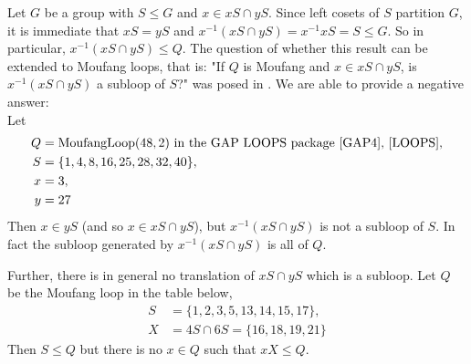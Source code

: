 \documentclass[12pt]{report}
\theoremstyle{definition}
\begin{document}
Let $G$ be a group with $S\leq G$ and $x\in xS\cap yS$. Since left cosets of $S$ partition $G$,
  it is immediate that $xS = yS$ and $x^{-1}(xS\cap yS) = x^{-1}xS = S\leq G$. So in particular,
  $x^{-1}(xS \cap yS) \leq Q$. The question of whether this result can be extended to Moufang
  loops, that is: "If $Q$ is Moufang and $x\in xS\cap yS$, is $x^{-1}(xS\cap yS)$ a subloop of
  $S$?" was posed in \cite{incidence}. We are able to provide a negative answer:\\ 
Let 
  \begin{align*}
    Q &= \text{MoufangLoop}(48, 2)\text{ in the GAP LOOPS package \cite{GAP4}, \cite{LOOPS},}\\
    S &= \{1,4,8,16,25,28,32,40\},\\
    x &= 3,\\
    y &= 27
  \end{align*}
Then $x\in yS$ (and so $x\in xS\cap yS$), but $x^{-1}(xS\cap yS)$ is not a subloop of $S$. In fact
  the subloop generated by $x^{-1}(xS\cap yS)$ is all of $Q$.

Further, there is in general no translation of $xS\cap yS$ which is a subloop. Let $Q$ be
  the Moufang loop in the table below, 
  \begin{align*}
    S &= \{1, 2, 3, 5, 13, 14, 15, 17\},\\
    X &= 4S\cap 6S = \{16, 18, 19, 21\}
  \end{align*}
Then $S\leq Q$ but there is no $x\in Q$ such that $xX\leq Q$.
\end{document}
